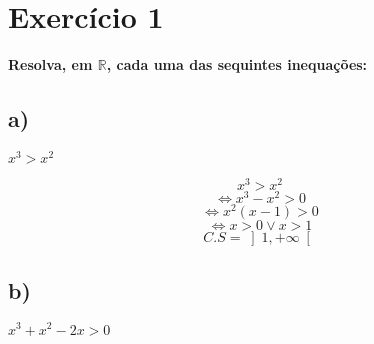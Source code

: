 \documentclass[a4paper]{article}
\begin{document}
	\section*{Exercício 1}\textbf{Resolva, em $\mathbb{R}$, cada uma das sequintes inequações:}
	\subsection*{a)}\textbf{$x^3>x^2$}
	
	\[x^3>x^2\]
	\[\Leftrightarrow x^3-x^2>0\]
	\[\Leftrightarrow x^2\left(x-1\right)>0\]
	\[\Leftrightarrow x>0 \lor x>1\]
	\[C.S=\left]1,+\infty\right[\]
	
	\subsection*{b)}\textbf{$x^3+x^2-2x>0$}
	
\end{document}
